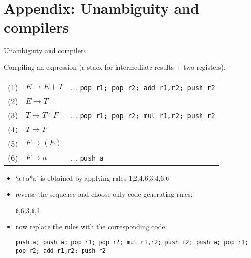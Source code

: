 \documentclass[handout]{beamer}
\begin{document}
\section*{Appendix: Unambiguity and compilers}


\begin{frame}{Unambiguity and compilers}

	Compiling an expression (a stack for intermediate results + two registers):
	
	\begin{tabular}{c l l}
		(1) &$E\rightarrow  E+T $ & ... \texttt{pop r1; pop r2; add r1,r2; push r2}\\
		(2) &$E\rightarrow  T $ & \\
		(3) &$T\rightarrow  T*F $& ... \texttt{pop r1; pop r2; mul r1,r2; push r2}\\
		(4) &$T\rightarrow  F $& \\
		(5) &$F\rightarrow (E) $& \\
		(6) &$F\rightarrow a $& ... \texttt{push a}
	\end{tabular}

	\begin{itemize}
		\item `a+a*a' is obtained by applying rules 1,2,4,6,3,4,6,6
		\item reverse the sequence and choose only code-generating rules:
		
		6,6,3,6,1

		\item now replace the rules with the corresponding code:
		
		\texttt{push a; push a; pop r1; pop r2; mul r1,r2; push r2; push a; pop r1; pop r2; add r1,r2; push r2} 
	\end{itemize}

\end{frame}
\end{document}
